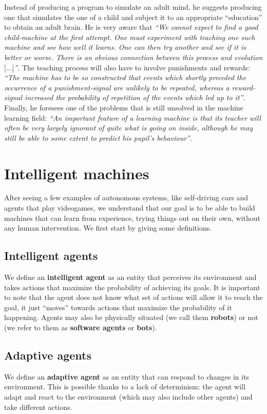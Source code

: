 Instead of producing a program to simulate an adult mind, he suggests producing one that simulates the one of a child and subject it to an appropriate ``education'' to obtain an adult brain. He is very aware that \textit{``We cannot expect to find a good child-machine at the first attempt. One must experiment with teaching one such machine and see how well it learns. One can then try another and see if it is better or worse. There is an obvious connection between this process and evolution} [...]\textit{''}. The teaching process will also have to involve punishments and rewards: \textit{``The machine has to be so constructed that events which shortly preceded the occurrence of a punishment-signal are unlikely to be repeated, whereas a reward-signal increased the probability of
repetition of the events which led up to it''}. Finally, he foresees one of the problems that is still unsolved in the machine learning field: \textit{``An important feature of a learning machine is that its teacher will often be very largely ignorant of quite what is going on inside, although he may
still be able to some extent to predict his pupil’s behaviour''}.

\section{Intelligent machines}
After seeing a few examples of autonomous systems, like self-driving cars and agents that play videogames, we understand that our goal is to be able to build machines that can learn from experience, trying things out on their own, without any human intervention. We first start by giving some definitions.

\subsection{Intelligent agents}
We define an \textbf{intelligent agent} as an entity that perceives its environment and takes actions that maximize the probability of achieving its goals. It is important to note that the agent does not know what set of actions will allow it to reach the goal, it just ``moves'' towards actions that maximize the probability of it happening. Agents may also be physically situated (we call them \textbf{robots}) or not (we refer to them as \textbf{software agents} or \textbf{bots}).

\subsection{Adaptive agents}
We define an \textbf{adaptive agent} as an entity that can respond to changes in its environment. This is possible thanks to a lack of determinism: the agent will adapt and react to the environment (which may also include other agents) and take different actions.

